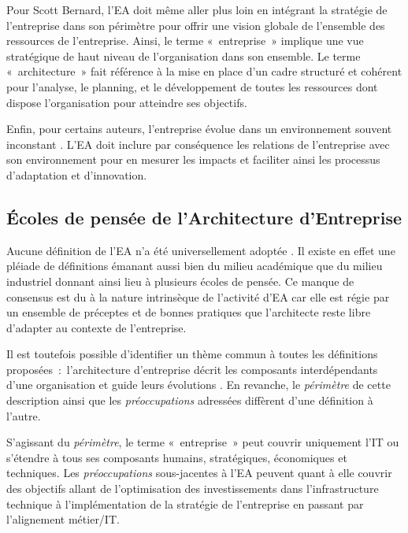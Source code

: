 Pour Scott Bernard, l'EA doit même aller plus loin en intégrant la stratégie de 
l'entreprise \cite{bernard2012introduction} dans son périmètre pour 
offrir une vision globale de l'ensemble des ressources de l'entreprise. Ainsi, le terme «~entreprise~» implique une vue stratégique de 
haut niveau de l'organisation dans son ensemble. Le terme 
«~architecture~» fait référence à la mise en place d'un cadre structuré et cohérent pour l'analyse, le planning, et le développement de toutes les ressources dont dispose l'organisation pour atteindre ses objectifs. 

Enfin, pour certains auteurs, l'entreprise évolue dans un environnement souvent inconstant \cite{lapalme2012three}. L'EA doit inclure par conséquence les relations de l'entreprise avec son environnement pour en mesurer les impacts et faciliter ainsi les processus d'adaptation et d'innovation.


	\subsection{Écoles de pensée de l'Architecture d'Entreprise} 
	\label{Lapalme}

Aucune définition de l'EA n'a été universellement adoptée \cite{mentz2012comparison} \cite{ranganathan2005enterprise}. Il existe en effet une pléiade de définitions émanant aussi bien du milieu académique que du milieu industriel donnant ainsi lieu à plusieurs écoles de pensée. Ce manque de consensus est du à la nature intrinsèque de l'activité d'EA car elle est régie par un ensemble de préceptes et de bonnes pratiques que l'architecte reste libre d'adapter au contexte de l'entreprise. 

Il est toutefois possible d'identifier un thème commun à toutes les définitions 
proposées~:~l'architecture d'entreprise décrit les composants interdépendants 
d'une organisation et guide leurs évolutions \cite{lapalme2012three}. En 
revanche, le \textit{périmètre} de cette description ainsi que les \textit{préoccupations} adressées diffèrent d'une définition à l'autre.

S'agissant du \textit{périmètre}, le terme «~entreprise~» peut couvrir uniquement l'IT  ou s'étendre à tous ses composants humains, stratégiques, économiques et techniques. Les \textit{préoccupations} sous-jacentes à l'EA peuvent quant à elle couvrir des objectifs allant de l'optimisation des investissements dans l'infrastructure technique à l'implémentation de la stratégie de l'entreprise en passant par l'alignement métier/IT. 

